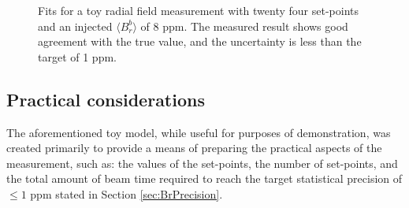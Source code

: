 \begin{figure}[t!]
\centering{}
{}
\caption{Fits for a toy radial field measurement with twenty four set-points and an injected $\langle B_{r}^{b} \rangle$ of 8 ppm. The measured result shows good agreement with the true value, and the uncertainty is less than the target of 1 ppm.}
\label{fig:ToyMonteCarloFits}  %
\end{figure}

\subsection{Practical considerations}\label{sec:PlanningBr}

The aforementioned toy model, while useful for purposes of demonstration, was created primarily to provide a means of preparing the practical aspects of the measurement, such as: the values of the set-points, the number of set-points, and the total amount of beam time required to reach the target statistical precision of $\leq1$ ppm stated in Section \ref{sec:BrPrecision}.

